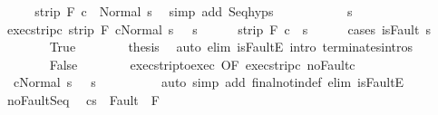 \begin{isabellebody}
\ \ \isamarkupfalse%
\ \isamarkupfalse%
\ {\isachardoublequoteopen}strip\ F\ {\isasymGamma}{\isasymturnstile}c{}\ {\isasymdown}\ Normal\ s{\isachardoublequoteclose}\ \isamarkupfalse%
\ {\isacharparenleft}simp\ add{\isacharcolon}\ Seq{\isachardot}hyps{\isacharparenright}\isanewline
\ \ \isamarkupfalse%
\isanewline
\ \ \isacommand{{\isacharbraceleft}}\isamarkupfalse%
\isanewline
\ \ \ \ \isamarkupfalse%
\ s{\isacharprime}\isanewline
\ \ \ \ \isamarkupfalse%
\ exec{\isacharunderscore}strip{\isacharunderscore}c{}{\isacharcolon}\ {\isachardoublequoteopen}strip\ F\ {\isasymGamma}{\isasymturnstile}{\isasymlangle}c{}{\isacharcomma}Normal\ s\ {\isasymrangle}\ {\isasymRightarrow}\ s{\isacharprime}{\isachardoublequoteclose}\isanewline
\ \ \ \ \isamarkupfalse%
\ {\isachardoublequoteopen}strip\ F\ {\isasymGamma}{\isasymturnstile}c{}\ {\isasymdown}\ s{\isacharprime}{\isachardoublequoteclose}\isanewline
\ \ \ \ \isamarkupfalse%
\ {\isacharparenleft}cases\ {\isachardoublequoteopen}isFault\ s{\isacharprime}{\isachardoublequoteclose}{\isacharparenright}\isanewline
\ \ \ \ \ \ \isamarkupfalse%
\ True\isanewline
\ \ \ \ \ \ \isamarkupfalse%
\ {\isacharquery}thesis\ \isamarkupfalse%
\ {\isacharparenleft}auto\ elim{\isacharcolon}\ isFaultE\ intro{\isacharcolon}\ terminates{\isachardot}intros{\isacharparenright}\isanewline
\ \ \ \ \isamarkupfalse%
\isanewline
\ \ \ \ \ \ \isamarkupfalse%
\ False\isanewline
\ \ \ \ \ \ \isamarkupfalse%
\ exec{\isacharunderscore}strip{\isacharunderscore}to{\isacharunderscore}exec\ {\isacharbrackleft}OF\ exec{\isacharunderscore}strip{\isacharunderscore}c{}{\isacharbrackright}\ noFault{\isacharunderscore}c{}\isanewline
\ \ \ \ \ \ \isamarkupfalse%
\ {\isacharasterisk}{\isacharcolon}\ {\isachardoublequoteopen}{\isasymGamma}{\isasymturnstile}{\isasymlangle}c{}{\isacharcomma}Normal\ s\ {\isasymrangle}\ {\isasymRightarrow}\ s{\isacharprime}{\isachardoublequoteclose}\isanewline
\ \ \ \ \ \ \ \ \isamarkupfalse%
\ {\isacharparenleft}auto\ simp\ add{\isacharcolon}\ final{\isacharunderscore}notin{\isacharunderscore}def\ elim{\isacharbang}{\isacharcolon}\ isFaultE{\isacharparenright}\isanewline
\ \ \ \ \ \ \isamarkupfalse%
\ noFault{\isacharunderscore}Seq\ \isamarkupfalse%
\ {\isachardoublequoteopen}{\isasymGamma}{\isasymturnstile}{\isasymlangle}c{}{\isacharcomma}s{\isacharprime}\ {\isasymrangle}\ {\isasymRightarrow}{\isasymnotin}Fault\ {\isacharbackquote}\ F{\isachardoublequoteclose}\isanewline

\end{isabellebody}
